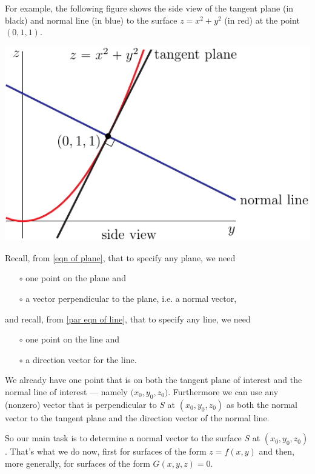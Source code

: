 For example, the following 
figure shows the side view of the tangent plane (in black) and normal line 
(in blue) to the surface $z=x^2+y^2$ (in red) at the point $(0,1,1)$.
\begin{efig}
\begin{center}
   \includegraphics{tanPlaneNormalLine.pdf}
\end{center}
\end{efig}

 Recall, from \eqref{eqn of plane}, that to specify any plane, we need
\begin{itemize}\itemsep1pt \parskip0pt 
\item[$\circ$] 
one point on the plane and
\item[$\circ$] 
a vector perpendicular to the plane, i.e. a normal vector,
\end{itemize}
and recall, from \eqref{par eqn of line}, that to specify any line, we need
\begin{itemize}\itemsep1pt \parskip0pt 
\item[$\circ$] 
one point on the line and
\item[$\circ$] 
a direction vector for the line.
\end{itemize}
We already have one point that is on both the tangent plane of interest 
and the normal line of interest --- namely $\big(x_0,y_0,z_0\big)$. 
Furthermore we can use any (nonzero) vector that is perpendicular to $S$
at $(x_0,y_0,z_0)$ as both the normal vector to the tangent plane and the
direction vector of the normal line.

So our main task is to determine a normal vector to the surface $S$ at $(x_0,y_0,z_0)$. That's what we do now, first for surfaces of the
form $z=f(x,y)$ and then, more generally, for surfaces of the form 
$G(x,y,z)=0$.

